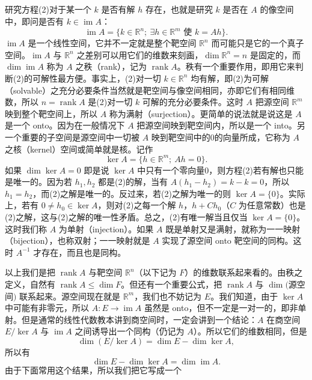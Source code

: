 研究方程(2)对于某一个 $k$ 是否有解 $h$ 存在，也就是研究 $k$ 是否在 $A$ 的像空间中，即问是否有 $k\in\operatorname{im}A$：
\begin{equation}
 \operatorname{im}A=\{k\in\mathbb R^n;\ \exists h\in\mathbb R^m\text{ 使 }k=Ah\}.
 \tag{3}
\end{equation}
$\operatorname{im}A$ 是一个线性空间，它并不一定就是整个靶空间 $\mathbb R^n$ 而可能只是它的一个真子空间。$\operatorname{im}A$ 与 $\mathbb R^n$ 之差别可以用它们的维数来刻画，$\dim\mathbb R^n=n$ 是固定的，而 $\dim\operatorname{im}A$ 称为 $A$ 之秩（rank），记为 $\operatorname{rank}A$。秩有一个重要作用，即用它来判断(2)的可解性最方便。事实上，(2)对一切 $k\in\mathbb R^n$ 均有解，即(2)为可解（solvable）之充分必要条件当然就是靶空间与像空间相同，亦即它们有相同维数，所以 $n=\operatorname{rank}A$ 是(2)对一切 $k$ 可解的充分必要条件。这时 $A$ 把源空间 $\mathbb R^m$ 映到整个靶空间上，所以 $A$ 称为满射（surjection）。更简单的说法就是说这是 $A$ 是一个 onto。因为在一般情况下 $A$ 把源空间映到靶空间内，所以是一个 into。另一个重要的子空间是源空间中一切被 $A$ 映到靶空间中的0的向量所成，它称为 $A$ 之核（kernel）空间或简单就是核。记作
\[
 \ker A=\{h\in\mathbb R^m;\ Ah=0\}.
\]
如果 $\dim\ker A=0$ 即是说 $\ker A$ 中只有一个零向量0，则方程(2)若有解也只能是唯一的。因为若 $h_1,h_2$ 都是(2)的解，当有 $A(h_1-h_2)=k-k=0$，所以 $h_1=h_2$，而(2)之解是唯一的。反过来，若(2)之解为唯一的则 $\ker A=\{0\}$。实际上，若有 $0\ne h_0\in\ker A$，则对(2)之每一个解 $h$，$h+Ch_0$（$C$ 为任意常数）也是(2)之解，这与(2)之解的唯一性矛盾。总之，(2)有唯一解当且仅当 $\ker A=\{0\}$。这时我们称 $A$ 为单射（injection）。如果 $A$ 既是单射又是满射，就称为一一映射（bijection），也称双射；一一映射就是 $A$ 实现了源空间 onto 靶空间的同构。这时 $A^{-1}$ 才存在，而且也是同构。

以上我们是把 $\operatorname{rank}A$ 与靶空间 $\mathbb R^n$（以下记为 $F$）的维数联系起来看的。由秩之定义，自然有 $\operatorname{rank}A\le\dim F$。但还有一个重要公式，把 $\operatorname{rank}A$ 与 $\dim($源空间$)$ 联系起来。源空间现在就是 $\mathbb R^m$，我们也不妨记为 $E$。我们知道，由于 $\ker A$ 中可能有非零元，所以 $A:E\to\operatorname{im}A$ 虽然是 onto，但不一定是一对一的，即非单射。但是通常的线性代数教本讲到商空间时，一定会讲到一个结论：$A$ 在商空间 $E/\ker A$ 与 $\operatorname{im}A$ 之间诱导出一个同构（仍记为 $A$）。所以它们的维数相同，但是
\[
 \dim(E/\ker A)=\dim E-\dim\ker A,
\]
所以有
\begin{equation}
 \dim E-\dim\ker A=\dim\operatorname{im}A.
 \tag{4}
\end{equation}
由于下面常用这个结果，所以我们把它写成一个

